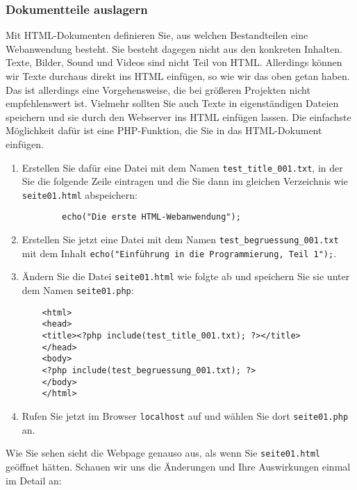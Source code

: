 \subsubsection{Dokumentteile auslagern}

Mit HTML-Dokumenten definieren Sie, aus welchen Bestandteilen eine Webanwendung besteht. Sie besteht dagegen nicht aus den konkreten Inhalten. Texte, Bilder, Sound und Videos sind nicht Teil von HTML. Allerdings können wir Texte durchaus direkt ins HTML einfügen, so wie wir das oben getan haben. Das ist allerdings eine Vorgehensweise, die bei größeren Projekten nicht empfehlenswert ist. Vielmehr sollten Sie auch Texte in eigenständigen Dateien speichern und sie durch den Webserver ins HTML einfügen lassen. Die einfachste Möglichkeit dafür ist eine PHP-Funktion, die Sie in das HTML-Dokument einfügen.\\

\begin{enumerate}
	\item Erstellen Sie dafür eine Datei mit dem Namen \verb|test_title_001.txt|, in der Sie die folgende Zeile eintragen und die Sie dann im gleichen Verzeichnis wie \verb|seite01.html| abspeichern:
	\begin{verbatim}
		echo("Die erste HTML-Webanwendung");
	\end{verbatim}
	\item Erstellen Sie jetzt eine Datei mit dem Namen \verb|test_begruessung_001.txt| mit dem Inhalt \verb|echo("Einführung in die Programmierung, Teil 1");|.
	\item Ändern Sie die Datei \verb|seite01.html| wie folgte ab und speichern Sie sie unter dem Namen \verb|seite01.php|:
	\begin{verbatim}
	<html>
	<head>
	<title><?php include(test_title_001.txt); ?></title>
	</head>
	<body>
	<?php include(test_begruessung_001.txt); ?>
	</body>
	</html>
	\end{verbatim}
	\item Rufen Sie jetzt im Browser \verb|localhost| auf und wählen Sie dort \verb|seite01.php| an.
\end{enumerate}

Wie Sie sehen sieht die Webpage genauso aus, als wenn Sie \verb|seite01.html| geöffnet hätten. Schauen wir uns die Änderungen und Ihre Auswirkungen einmal im Detail an:

